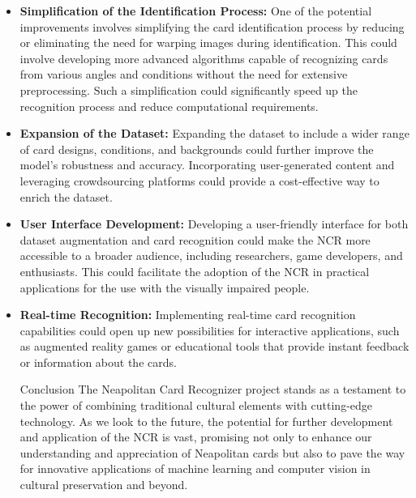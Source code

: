 \documentclass[twocolumn, a4paper,10pt]{article}
\begin{document}
\begin{itemize}
  
  \item \textbf{Simplification of the Identification Process:} One of the potential improvements involves simplifying the card identification process by reducing or eliminating the need for warping images during identification. This could involve developing more advanced algorithms capable of recognizing cards from various angles and conditions without the need for extensive preprocessing. Such a simplification could significantly speed up the recognition process and reduce computational requirements.

  \item \textbf{Expansion of the Dataset:} Expanding the dataset to include a wider range of card designs, conditions, and backgrounds could further improve the model's robustness and accuracy. Incorporating user-generated content and leveraging crowdsourcing platforms could provide a cost-effective way to enrich the dataset.

  \item \textbf{User Interface Development:} Developing a user-friendly interface for both dataset augmentation and card recognition could make the NCR more accessible to a broader audience, including researchers, game developers, and enthusiasts. This could facilitate the adoption of the NCR in practical applications for the use with the visually impaired people.

  \item \textbf{Real-time Recognition:} Implementing real-time card recognition capabilities could open up new possibilities for interactive applications, such as augmented reality games or educational tools that provide instant feedback or information about the cards.

Conclusion
The Neapolitan Card Recognizer project stands as a testament to the power of combining traditional cultural elements with cutting-edge technology. As we look to the future, the potential for further development and application of the NCR is vast, promising not only to enhance our understanding and appreciation of Neapolitan cards but also to pave the way for innovative applications of machine learning and computer vision in cultural preservation and beyond.
\end{itemize}
\nocite{*}
\def\biblsectioniographystyle{plainnat}


\newpage
\onecolumn
\end{document}

